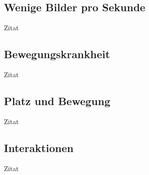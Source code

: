\subsection{Wenige Bilder pro Sekunde}
Zitat \cite{bobsch 123 bobsch}

\subsection{Bewegungskrankheit}
Zitat \cite{bobsch 123 bobsch}

\subsection{Platz und Bewegung}
Zitat \cite{bobsch 123 bobsch}

\subsection{Interaktionen}
Zitat \cite{bobsch 123 bobsch}